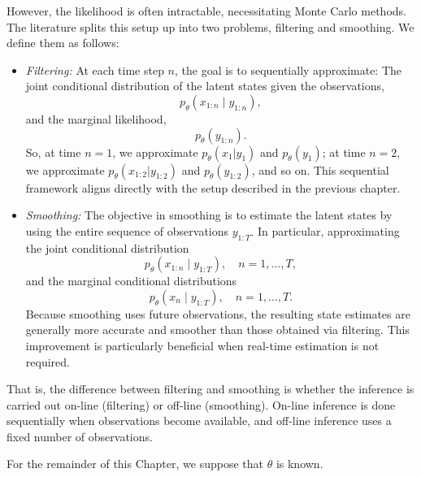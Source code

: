 However, the likelihood is often intractable, necessitating Monte Carlo methods. The literature splits this setup up into two problems, filtering and smoothing. We define them as follows:
\begin{itemize}
	\item \emph{Filtering:} At each time step $n$, the goal is to sequentially approximate:
	The joint conditional distribution of the latent states given the observations,
	\[
	p_\theta(x_{1:n}\mid y_{1:n}),
	\]
	and the marginal likelihood,
	\[
	p_\theta(y_{1:n}).
	\]
	So, at time $n=1$, we approximate $p_\theta(x_1\vert y_1)$ and $p_\theta(y_1)$; at time $n=2$, we approximate $p_\theta(x_{1:2}\vert y_{1:2})$ and $p_\theta(y_{1:2})$, and so on. This sequential framework aligns directly with the setup described in the previous chapter.
	
	\item \emph{Smoothing:} The objective in smoothing is to estimate the latent states by using the entire sequence of observations $y_{1:T}$. In particular, approximating the joint conditional distribution
	\[
		p_\theta(x_{1:n}\mid y_{1:T}), \quad n=1,\dots,T,
	\]
	and the marginal conditional distributions
	\[
		p_\theta(x_n\mid y_{1:T}), \quad n=1,\dots,T.
	\]
	Because smoothing uses future observations, the resulting state estimates are generally more accurate and smoother than those obtained via filtering. This improvement is particularly beneficial when real-time estimation is not required.
\end{itemize}
That is, the difference between filtering and smoothing is whether the inference is carried out on-line (filtering) or off-line (smoothing). On-line inference is done sequentially when observations become available, and off-line inference uses a fixed number of observations. 

For the remainder of this Chapter, we suppose that $\theta$ is known. 


